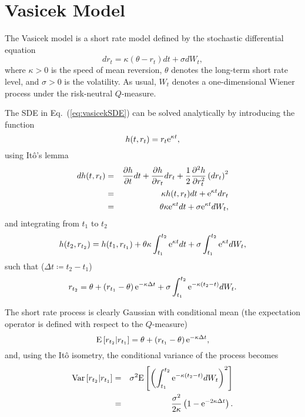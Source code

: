\section{Vasicek Model}
The Vasicek model \cite{Vasicek1977} is a short rate model defined by the stochastic differential equation 
\begin{equation}
dr_t = \kappa \left( \theta - r_t \right) dt + \sigma dW_t,
\label{eq:vasicekSDE}
\end{equation}
where $\kappa > 0$ is the speed of mean reversion, $\theta$ denotes the long-term short rate level, and $\sigma > 0$ is the volatility.
As usual, $W_t$ denotes a one-dimensional Wiener process under the risk-neutral $Q$-measure.

The SDE in Eq.~(\ref{eq:vasicekSDE}) can be solved analytically by introducing the function
\begin{equation}
h(t, r_t) = r_t \text{e}^{\kappa t},
\end{equation}
using It\^{o}'s lemma
\begin{eqnarray}
dh(t, r_t) &=& \frac{\partial h}{\partial t} dt + \frac{\partial h}{\partial r_t} dr_t + \frac{1}{2}\frac{\partial^2 h}{\partial r_t^2} \left(dr_t\right)^2 \\
&=& \kappa h(t, r_t) dt + \text{e}^{\kappa t} dr_t \\
&=& \theta \kappa \text{e}^{\kappa t} dt + \sigma \text{e}^{\kappa t} dW_t,
\end{eqnarray}
and integrating from $t_1$ to $t_2$
\begin{equation}
h(t_2, r_{t_2}) = h(t_1, r_{t_1}) + \theta \kappa \int_{t_1}^{t_2} \text{e}^{\kappa t} dt + \sigma \int_{t_1}^{t_2} \text{e}^{\kappa t} dW_t,
\end{equation}
such that ($\Delta t \coloneq t_2 - t_1$)
\begin{equation}
r_{t_2} = \theta + \left( r_{t_1} - \theta \right) \text{e}^{-\kappa \Delta t} + \sigma \int_{t_1}^{t_2} \text{e}^{-\kappa \left(t_2 - t\right)} dW_t.
\end{equation}

The short rate process is clearly Gaussian with conditional mean (the expectation operator is defined with respect to the $Q$-measure)
\begin{equation}
\mathrm{E} \left[ r_{t_2} | r_{t_1} \right] = \theta + \left( r_{t_1} - \theta \right) \text{e}^{-\kappa \Delta t},
\end{equation}
and, using the It\^{o} isometry, the conditional variance of the process becomes
\begin{eqnarray}
\mathrm{Var} \left[ r_{t_2} | r_{t_1} \right] &=& \sigma^2 \mathrm{E} \left[ \left( \int_{t_1}^{t_2} \text{e}^{-\kappa \left(t_2 - t\right)} dW_t \right)^2 \right] \\
&=& \frac{\sigma^2}{2 \kappa} \left( 1 - \text{e}^{-2 \kappa \Delta t}\right).
\end{eqnarray}

